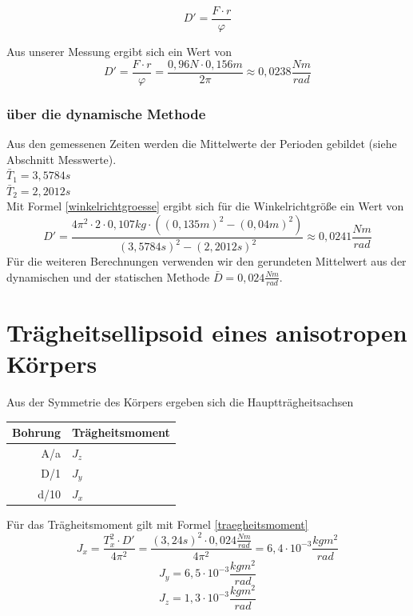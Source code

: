 \documentclass[12pt,a4paper,]{scrreprt}
\let\phi\varphi
\begin{document}
					\begin{equation}
						D' = \frac{F \cdot r}{\phi}
					\end{equation}
           
					Aus unserer Messung ergibt sich ein Wert von
					\begin{equation}
						D' = \frac{F \cdot r}{\phi} = \frac{0,96 N \cdot 0,156m}{2 \pi} \approx 0,0238 \frac{Nm}{rad}
					\end{equation}
     
        
				\subsubsection{über die dynamische Methode}
        	
					Aus den gemessenen Zeiten werden die Mittelwerte der Perioden gebildet (siehe Abschnitt Messwerte).\\
					$\bar T_1 = 3,5784 s$\\  $\bar T_2 = 2,2012s $\\
					Mit Formel \ref{winkelrichtgroesse} ergibt sich für die Winkelrichtgröße ein Wert von
					\begin{equation}
						D'=\frac{4\pi^2\cdot 2\cdot 0,107kg\cdot ((0,135m)^2-(0,04m)^2)}{(3,5784 s)^2-(2,2012s)^2} \approx 0,0241 \frac{Nm}{rad}
					\end{equation}
					Für die weiteren Berechnungen verwenden wir den gerundeten Mittelwert aus der dynamischen und der statischen Methode $\bar D = 0,024 \frac{Nm}{rad}$.
        \pagebreak
        
		\section{Trägheitsellipsoid eines anisotropen Körpers}
				Aus der Symmetrie des Körpers ergeben sich die Hauptträgheitsachsen 
				\begin{center}
            \begin{tabular}{r|l}
					Bohrung &  Trägheitsmoment \\ \hline \hline
					A/a & $J_{z}$ \\ 
					D/1 & $J_{y}$ \\ 
					d/10 & $J_{x}$ 
				\end{tabular}
			\end{center}
            Für das Trägheitsmoment gilt mit Formel \ref{traegheitsmoment}
            \begin{equation}
            	J_{x} = \frac{T_{x}^2 \cdot D'}{4\pi^2} = \frac{(3,24s)^2 \cdot 0,024 \frac{Nm}{rad}}{4\pi^2} =  6,4\cdot10^{-3} \frac{kgm^2}{rad} 
            \end{equation}
            \begin{equation}
            	J_{y} = 6,5\cdot10^{-3} \frac{kgm^2}{rad} 
            \end{equation}
            \begin{equation}
            	J_{z} = 1,3\cdot10^{-3} \frac{kgm^2}{rad} 
            \end{equation}
            
\end{document}
